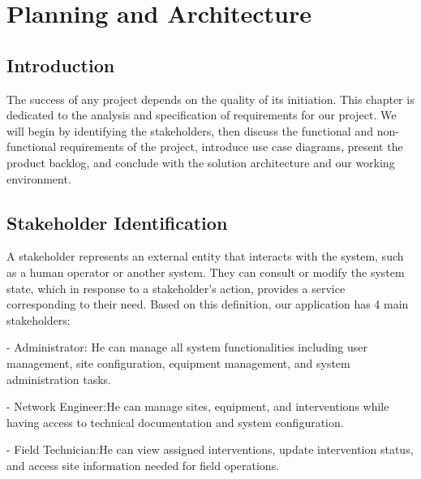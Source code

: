 \newpage

\lhead{\leftmark}
\chapter{Planning and Architecture}

\cfoot{\thepage}

\parindent=0.5in
\onehalfspacing
\section{Introduction}
The success of any project depends on the quality of its initiation. This chapter is dedicated to the analysis and specification of requirements for our project. We will begin by identifying the stakeholders, then discuss the functional and non-functional requirements of the project, introduce use case diagrams, present the product backlog, and conclude with the solution architecture and our working environment.

\section{Stakeholder Identification}
A stakeholder represents an external entity that interacts with the system, such as a human operator or another system. They can consult or modify the system state, which in response to a stakeholder's action, provides a service corresponding to their need. Based on this definition, our application has 4 main stakeholders:\vspace{0.5cm} \newline

- Administrator: \newline He can manage all system functionalities including user management, site configuration, equipment management, and system administration tasks.
\vspace{0.5cm} \newline

- Network Engineer:\newline He can manage sites, equipment, and interventions while having access to technical documentation and system configuration.\vspace{0.5cm} \newline

- Field Technician:\newline He can view assigned interventions, update intervention status, and access site information needed for field operations.
\vspace{0.5cm} \newline

